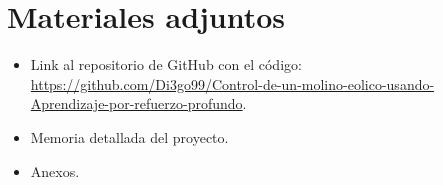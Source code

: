 \section{Materiales adjuntos}

\begin{itemize}
    \item Link al repositorio de GitHub con el código: \href{https://github.com/Di3go99/Control-de-un-molino-eolico-usando-Aprendizaje-por-refuerzo-profundo}{https://github.com/Di3go99/Control-de-un-molino-eolico-usando-Aprendizaje-por-refuerzo-profundo}.
    \item Memoria detallada del proyecto.
    \item Anexos.
\end{itemize}